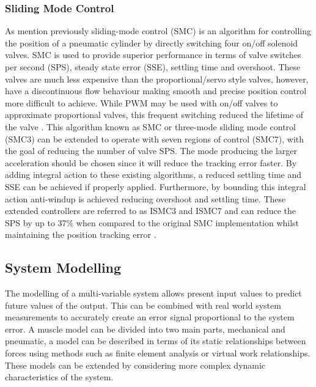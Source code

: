 \documentclass[11pt,a4paper]{article}
\begin{document}
\subsubsection{Sliding Mode Control}
\label{sub:sliding_mode_control}
As mention previously sliding-mode control (SMC) is an algorithm for controlling the position of a pneumatic cylinder by directly switching four on/off solenoid valves. SMC is used to provide superior performance in terms of valve switches per second (SPS), steady state error (SSE), settling time and overshoot. These valves are much less expensive than the proportional/servo style valves, however, have a discontinuous flow behaviour making smooth and precise position control more difficult to achieve. While PWM may be used with on/off valves to approximate proportional valves, this frequent switching reduced the lifetime of the valve \cite{zhang_bone_2018}. \newline
This algorithm known as SMC or three-mode sliding mode control (SMC3) can be extended to operate with seven regions of control (SMC7), with the goal of reducing the number of valve SPS. The mode producing the larger acceleration should be chosen since it will reduce the tracking error faster. By adding integral action to these existing algorithms, a reduced settling time and SSE can be achieved if properly applied. Furthermore, by bounding this integral action anti-windup is achieved reducing overshoot and settling time. These extended controllers are referred to as ISMC3 and ISMC7 and can reduce the SPS by up to 37\% when compared to the original SMC implementation whilst maintaining the position tracking error \cite{zhang_bone_2018}.

\subsection{System Modelling}
\label{sub:system_modelling}
The modelling of a multi-variable system allows present input values to predict future values of the output. This can be combined with real world system measurements to accurately create an error signal proportional to the system error. A muscle model can be divided into two main parts, mechanical and pneumatic, a model can be described in terms of its static relationships between forces using methods such as finite element analysis or virtual work relationships. These models can be extended by considering more complex dynamic characteristics of the system.
\end{document}

